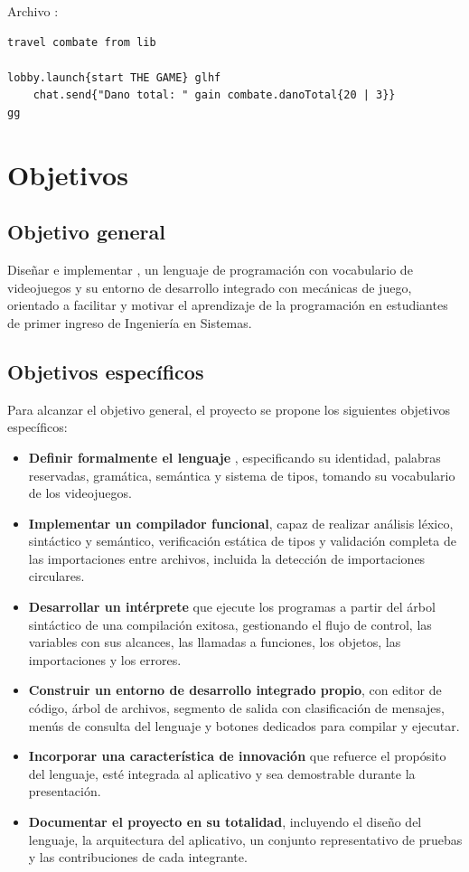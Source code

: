 Archivo :
\begin{lstlisting}
travel combate from lib

lobby.launch{start THE GAME} glhf
    chat.send{"Dano total: " gain combate.danoTotal{20 | 3}}
gg
\end{lstlisting}

\newpage
\section{Objetivos}

\subsection{Objetivo general}

Diseñar e implementar \ggez, un lenguaje de programación con vocabulario de videojuegos y su entorno de desarrollo integrado con mecánicas de juego, orientado a facilitar y motivar el aprendizaje de la programación en estudiantes de primer ingreso de Ingeniería en Sistemas.

\subsection{Objetivos específicos}

Para alcanzar el objetivo general, el proyecto se propone los siguientes objetivos específicos:

\begin{itemize}
  \item \textbf{Definir formalmente el lenguaje \ggez}, especificando su identidad, palabras reservadas, gramática, semántica y sistema de tipos, tomando su vocabulario de los videojuegos.
  \item \textbf{Implementar un compilador funcional}, capaz de realizar análisis léxico, sintáctico y semántico, verificación estática de tipos y validación completa de las importaciones entre archivos, incluida la detección de importaciones circulares.
  \item \textbf{Desarrollar un intérprete} que ejecute los programas a partir del árbol sintáctico de una compilación exitosa, gestionando el flujo de control, las variables con sus alcances, las llamadas a funciones, los objetos, las importaciones y los errores.
  \item \textbf{Construir un entorno de desarrollo integrado propio}, con editor de código, árbol de archivos, segmento de salida con clasificación de mensajes, menús de consulta del lenguaje y botones dedicados para compilar y ejecutar.
  \item \textbf{Incorporar una característica de innovación} que refuerce el propósito del lenguaje, esté integrada al aplicativo y sea demostrable durante la presentación.
  \item \textbf{Documentar el proyecto en su totalidad}, incluyendo el diseño del lenguaje, la arquitectura del aplicativo, un conjunto representativo de pruebas y las contribuciones de cada integrante.
\end{itemize}


